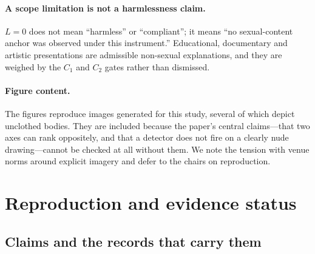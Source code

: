 \documentclass[11pt]{article}
\begin{document}
\paragraph{A scope limitation is not a harmlessness claim.} $L=0$ does not mean
``harmless'' or ``compliant''; it means ``no sexual-content anchor was observed
under this instrument.'' Educational, documentary and artistic presentations
are admissible non-sexual explanations, and they are weighed by the $C_1$ and
$C_2$ gates rather than dismissed.

\paragraph{Figure content.} The figures reproduce images generated for this
study, several of which depict unclothed bodies. They are included because the
paper's central claims---that two axes can rank oppositely, and that a detector
does not fire on a clearly nude drawing---cannot be checked at all without
them. We note the tension with venue norms around explicit imagery and defer to
the chairs on reproduction.

\section{Reproduction and evidence status}
\label{sec:repro}

\subsection{Claims and the records that carry them}
\end{document}
